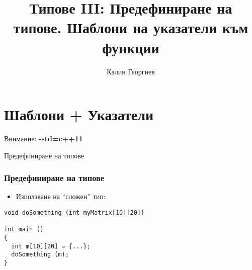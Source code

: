 \documentclass{beamer}
\begin{document}
\title[Обектно ориентирано програмиране]{Типове III: Предефиниране на типове. Шаблони на указатели към функции} 
\author{Калин Георгиев} 
\frame{\titlepage} 


\section{Шаблони + Указатели} 




\begin{frame}
\centerline{Внимание: \textbf{-std=c++11}}
\end{frame}

\begin{frame}
\centerline{Предефиниране на типове}
\end{frame}

\begin{frame}[fragile]
\frametitle{Предефиниране на типове}

\begin{itemize}
  \item Използване на ``сложен'' тип:
\end{itemize}

\begin{flushleft}
\begin{lstlisting}
void doSomething (int myMatrix[10][20])

int main ()
{
  int m[10][20] = {...};
  doSomething (m);
}
\end{lstlisting}	
\end{flushleft}

\end{frame}
\end{document}
